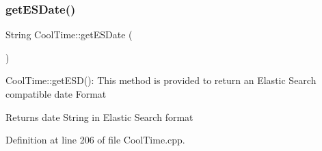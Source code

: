\subsubsection{\texorpdfstring{get\+E\+S\+Date()}{getESDate()}}
{\footnotesize\ttfamily String Cool\+Time\+::get\+E\+S\+Date (\begin{DoxyParamCaption}{ }\end{DoxyParamCaption})}

Cool\+Time\+::get\+E\+S\+D()\+: This method is provided to return an Elastic Search compatible date Format

\begin{DoxyReturn}{Returns}
date String in Elastic Search format 
\end{DoxyReturn}


Definition at line 206 of file Cool\+Time.\+cpp.


